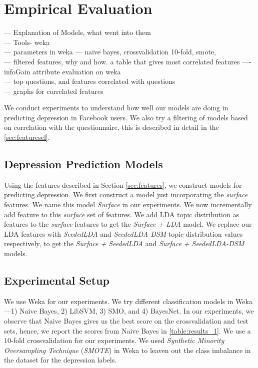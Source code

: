 
\section{Empirical Evaluation}
\label{sec:experiments}

--- Explanation of Models, what went into them\\
--- Tools- weka \\
--- parameters in weka --- naive bayes, crossvalidation 10-fold, smote, \\
--- filtered features, why and how. a table that gives most correlated features ---- infoGain attribute evaluation on weka\\
--- top questions, and features correlated with questions\\
--- graphs for correlated features

We conduct experiments to understand how well our models are doing in predicting depression in Facebook users. We also try a filtering of models based on correlation with the questionnaire, this is described in detail in the \ref{sec:featuresel}.
\subsection{Depression Prediction Models}

Using the features described in Section \ref{sec:features}, we construct models for predicting depression. We first construct a model just incorporating the \textit{surface} features. We name this model \textit{Surface} in our experiments. We now incrementally add feature to this \textit{surface} set of features. We add LDA topic distribution as features to the \textit{surface} features to get the \textit{Surface + LDA} model. We replace our LDA features with \textit{SeededLDA} and \textit{SeededLDA-{DSM}} topic distribution values respectively, to get the \textit{Surface + SeededLDA} and \textit{Surface + SeededLDA-DSM} models. 

\subsection{Experimental Setup}

We use Weka \cite{weka} for our experiments. We try different classification models in Weka---1) Naive Bayes, 2) LibSVM, 3) SMO, and 4) BayesNet. In our experiments, we observe that Naive Bayes gives us the best score on the crossvalidation and test sets, hence, we report the scores from Naive Bayes in \ref{table:results_1}. We use a 10-fold crossvalidation for our experiments. We used \textit{Synthetic Minority Oversampling Technique} (\textit{SMOTE}) in Weka to leaven out the class imbalance in the dataset for the depression labels.

